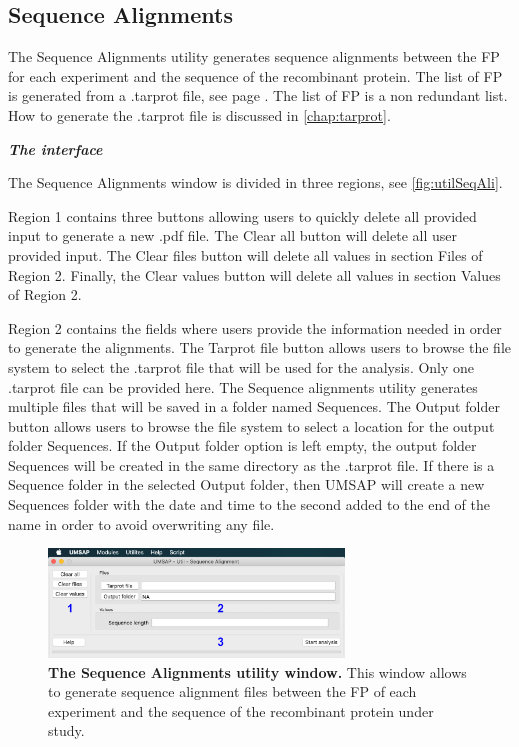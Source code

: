 \subsection{Sequence Alignments}
\label{subsec:utilSeqAli}
The Sequence Alignments utility generates sequence alignments between the FP for each experiment and the sequence of the recombinant protein. The list of FP is generated from a .tarprot file, see page \pageref{par:tarprotPIP}. The list of FP is a non redundant list. How to generate the .tarprot file is discussed in \autoref{chap:tarprot}.

\textit{\textbf{The interface}}

The Sequence Alignments window is divided in three regions, see \autoref{fig:utilSeqAli}.

Region \num{1} contains three buttons allowing users to quickly delete all provided input to generate a new .pdf file. The Clear all button will delete all user provided input. The Clear files button will delete all values in section Files of Region \num{2}. Finally, the Clear values button will delete all values in section Values of Region \num{2}.

Region \num{2} contains the fields where users provide the information needed in order to generate the alignments. The Tarprot file button allows users to browse the file system to select the .tarprot file that will be used for the analysis. Only one .tarprot file can be provided here. The Sequence alignments utility generates multiple files that will be saved in a folder named Sequences. The Output folder button allows users to browse the file system to select a location for the output folder Sequences. If the Output folder option is left empty, the output folder Sequences will be created in the same directory as the .tarprot file. If there is a Sequence folder in the selected Output folder, then UMSAP will create a new Sequences folder with the date and time to the second added to the end of the name in order to avoid overwriting any file. 

\begin{figure}[h]
	\centering
	\includegraphics[width=0.7\textwidth]{./IMAGES/UTIL-SEQ-WINDOW/util-seq.jpg}	    
	\caption[The Sequence Alignments utility window]{\textbf{The Sequence Alignments utility window.} This window allows to generate sequence alignment files between the FP of each experiment and the sequence of the recombinant protein under study.} 
	\label{fig:utilSeqAli}
	\vspace{-5pt} 	
\end{figure} 

